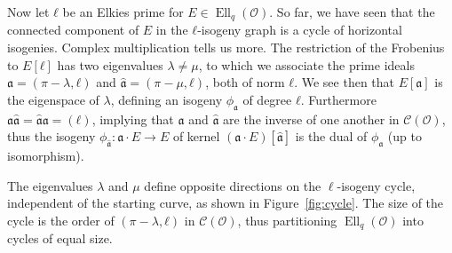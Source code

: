\documentclass{llncs}
\newcommand{\Cl}{\mathcal{C}}
\renewcommand{\O}{\mathcal{O}}
\renewcommand{\frak}{\mathfrak}
\DeclareMathOperator{\Ell}{Ell}
\begin{document}
Now let $ℓ$ be an Elkies prime for $E\in\Ell_q(\O)$. So far, we have seen that the
connected component of $E$ in the $ℓ$-isogeny graph is a cycle of
horizontal isogenies. Complex multiplication tells us more. The
restriction of the Frobenius to $E[ℓ]$ has two eigenvalues $λ≠μ$, to
which we associate the prime ideals $\frak a=(π-λ,ℓ)$ and
$\hat{\frak a}=(π-μ,ℓ)$, both of norm $ℓ$. We see then that
$E[\frak a]$ is the eigenspace of $λ$, defining an isogeny
$ϕ_{\frak{a}}$ of degree $ℓ$. Furthermore
$\frak a\hat{\frak a} = \hat{\frak a}\frak a = (ℓ)$, implying that
$\frak a$ and $\hat{\frak a}$ are the inverse of one another in
$\Cl(\O)$, thus the isogeny $ϕ_{\hat{\frak a}}:\frak a·E→E$ of
kernel $(\frak a·E)[\hat{\frak a}]$ is the dual of $ϕ_{\frak a}$ (up
to isomorphism). 

The eigenvalues $λ$ and $μ$ define opposite directions on the
$\ell$-isogeny cycle,
independent of the starting curve,
as shown in Figure~\ref{fig:cycle}.  
The size of the cycle is the order of $(π-λ,ℓ)$ in $\Cl(\O)$,
thus partitioning $\Ell_q(\O)$ into cycles of equal size.
\end{document}
